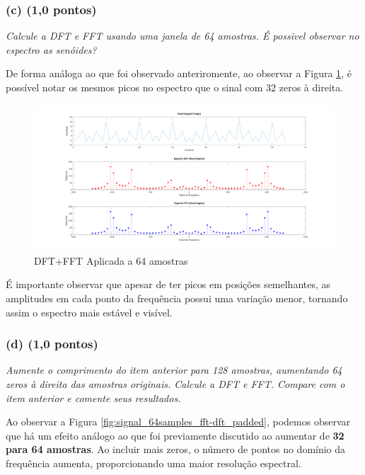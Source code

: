 \subsubsection*{(c) \textbf{(1,0 pontos)}}
\textit{Calcule a DFT e FFT usando uma janela de 64 amostras. É possivel observar no espectro as senóides?}

De forma análoga ao que foi observado anteriromente, ao observar a Figura \ref{fig:signal_64samples_fft-dft}, é possível notar os mesmos picos no espectro que o sinal com 32 zeros à direita.

\begin{figure}[H]
    \centering
    \includegraphics[width=1\linewidth]{03_experimental_analysis//assets/plot_results/64_samples_dft_fft.png}
    \caption{DFT+FFT Aplicada a 64 amostras}
    \label{fig:signal_64samples_fft-dft}
\end{figure}

É importante observar que apesar de ter picos em posições semelhantes, as amplitudes em cada ponto da frequência possui uma variação menor, tornando assim o espectro mais estável e visível.

\subsubsection*{(d) \textbf{(1,0 pontos)}}
\textit{Aumente o comprimento do item anterior para 128 amostras, aumentando 64 zeros à direita das amostras originais. Calcule a DFT e FFT. Compare com o item anterior e comente seus resultados.}

Ao observar a Figura \ref{fig:signal_64samples_fft-dft_padded}, podemos observar que há um efeito análogo ao que foi previamente discutido ao aumentar de \textbf{32 para 64 amostras}. Ao incluir mais zeros, o número de pontos no domínio da frequência aumenta, proporcionando uma maior resolução espectral.

